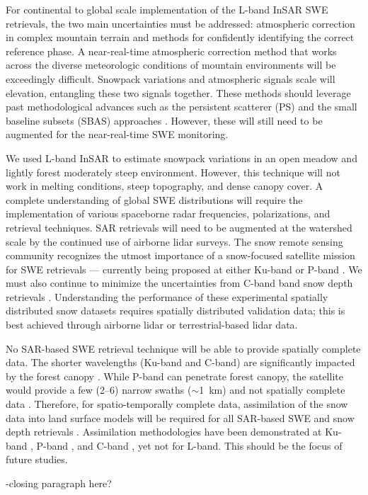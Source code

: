 For continental to global scale implementation of the L-band InSAR SWE retrievals, the two main uncertainties must be addressed: atmospheric correction in complex mountain terrain and methods for confidently identifying the correct reference phase. A near-real-time atmospheric correction method that works across the diverse meteorologic conditions of mountain environments will be exceedingly difficult. Snowpack variations and atmospheric signals scale will elevation, entangling these two signals together. These methods should leverage past methodological advances such as the persistent scatterer (PS) \citep{ferrettiPermanentScatterersSAR2001} and the small baseline subsets (SBAS) approaches \citep{berardinoNewAlgorithmSurface2002a,yunjunSmallBaselineInSAR2019a}. However, these will still need to be augmented for the near-real-time SWE monitoring.

We used L-band InSAR to estimate snowpack variations in an open meadow and lightly forest moderately steep environment. However, this technique will not work in melting conditions, steep topography, and dense canopy cover. A complete understanding of global SWE distributions will require the implementation of various spaceborne radar frequencies, polarizations, and retrieval techniques. SAR retrievals will need to be augmented at the watershed scale by the continued use of airborne lidar surveys. The snow remote sensing community recognizes the utmost importance of a snow-focused satellite mission for SWE retrievals --- currently being proposed at either Ku-band \citep{tsangReviewArticleGlobal2022, garnaudQuantifyingSnowMass2019} or P-band \citep{shahRemoteSensingSnow2017}.  We must also continue to minimize the uncertainties from C-band band snow depth retrievals \citep{lievensSnowDepthVariability2019,lievensSentinel1SnowDepth2022}. Understanding the performance of these experimental spatially distributed snow datasets requires spatially distributed validation data; this is best achieved through airborne lidar \citep{painterAirborneSnowObservatory2016} or terrestrial-based lidar data.

No SAR-based SWE retrieval technique will be able to provide spatially complete data. The shorter wavelengths (Ku-band and C-band) are significantly impacted by the forest canopy \citep{rottColdRegionsHydrology2010}. While P-band can penetrate forest canopy, the satellite would provide a few (2--6) narrow swaths ($\sim$1~km) and not spatially complete data \citep{yuehSatelliteSyntheticAperture2021}. Therefore, for spatio-temporally complete data, assimilation of the snow data into land surface models will be required for all SAR-based SWE and snow depth retrievals \citep{girottoDataAssimilationImproves2020}. Assimilation methodologies have been demonstrated at Ku-band \citep{wrzesienDevelopmentNatureRun2022, choEvaluatingUtilityActive2022}, P-band \citep{maEstimatingSpatiotemporallyContinuous2023}, and C-band \citep{girottoIdentifyingSnowfallElevation2023, brangersSentinel1SnowDepth2023}, yet not for L-band. This should be the focus of future studies.

-closing paragraph here?



